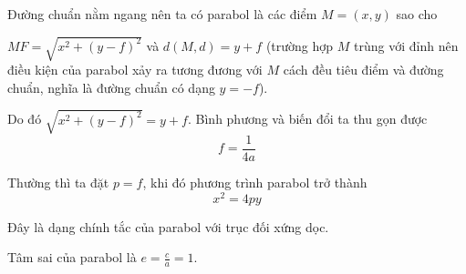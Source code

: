 Đường chuẩn nằm ngang nên ta có parabol là các điểm $M = (x, y)$ sao cho

$MF = \sqrt{x^2 + (y-f)^2}$ và $d(M, d) = y+f$ 
(trường hợp $M$ trùng với đỉnh nên điều kiện của parabol xảy ra tương đương với $M$ cách đều tiêu điểm và đường chuẩn, nghĩa là đường chuẩn có dạng $y=-f$).

Do đó $\sqrt{x^2 + (y-f)^2} = y + f$. Bình phương và biến đổi ta thu gọn được
$$f = \frac{1}{4a}$$

Thường thì ta đặt $p = f$, khi đó phương trình parabol trở thành 
$$x^2 = 4py$$

Đây là dạng chính tắc của parabol với trục đối xứng dọc.

Tâm sai của parabol là $e = \frac{c}{a} = 1$.

\newpage